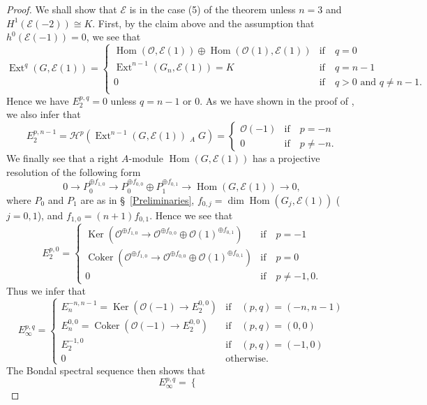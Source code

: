 \documentclass[a4paper,12pt]{amsart}
\DeclareMathOperator{\Hom}{Hom}
\DeclareMathOperator{\Ext}{Ext}
\DeclareMathOperator{\lotimes}{\otimes^{\mathbb{L}}}
\DeclareMathOperator{\Ker}{Ker}
\DeclareMathOperator{\Coker}{Coker}
\begin{document}
\begin{proof}
We shall show that $\mathcal{E}$ is in the case (5) of the theorem
unless $n=3$ and $H^1(\mathcal{E}(-2))\cong K$.
First, by the claim above and the assumption that $h^0(\mathcal{E}(-1))=0$, we see that 
\[\Ext^q(G,\mathcal{E}(1))=
\begin{cases}
\Hom(\mathcal{O},\mathcal{E}(1))\oplus\Hom(\mathcal{O}(1),\mathcal{E}(1))& \textrm{if}\quad  q=0\\
\Ext^{n-1}(G_n,\mathcal{E}(1))=K& \textrm{if}\quad  q= n-1\\
0& \textrm{if}\quad  q>0\textrm{ and }q\neq n-1.\\
\end{cases}
\]
Hence we have $E_2^{p,q}=0$ unless $q= n-1$ or $0$.
As we have shown in the proof of \cite[Proposition 1]{MR3275418},
we also infer that 
\[
E_2^{p,n-1}=\mathcal{H}^p(\Ext^{n-1}(G,\mathcal{E}(1))\lotimes_A G)
=
\begin{cases}
\mathcal{O}(-1)& \textrm{if}\quad  p= -n\\
0& \textrm{if}\quad  p\neq -n.
\end{cases}
\]
We finally see that a right $A$-module $\Hom(G,\mathcal{E}(1))$ has a projective resolution of the following form
\[
0\to P_0^{\oplus f_{1,0}}\to P_0^{\oplus f_{0,0}}\oplus P_1^{\oplus f_{0,1}}\to \Hom (G,\mathcal{E}(1))\to 0,
\]
where $P_0$ and $P_1$ are as in \S~\ref{Preliminaries},
$f_{0,j}=\dim \Hom(G_j, \mathcal{E}(1))$ ($j=0,1$), and $f_{1,0}=(n+1)f_{0,1}$.
Hence we see that
\[E_2^{p,0}=
\begin{cases}
\Ker (\mathcal{O}^{\oplus f_{1,0}}\to \mathcal{O}^{\oplus f_{0,0}}\oplus \mathcal{O}(1)^{\oplus f_{0,1}})& \textrm{if}\quad  p= -1\\
\Coker (\mathcal{O}^{\oplus f_{1,0}}\to \mathcal{O}^{\oplus f_{0,0}}\oplus \mathcal{O}(1)^{\oplus f_{0,1}})& \textrm{if}\quad  p= 0\\
0& \textrm{if}\quad p\neq -1, 0.
\end{cases}
\]
Thus we infer that
\[E_{\infty}^{p,q}=
\begin{cases}
E_n^{-n,n-1}=\Ker (\mathcal{O}(-1)\to E_2^{0,0})& \textrm{if}\quad  (p,q)= (-n,n-1)\\
E_n^{0,0}=\Coker (\mathcal{O}(-1)\to E_2^{0,0})& \textrm{if}\quad  (p,q)= (0,0)\\
E_2^{-1,0}& \textrm{if}\quad (p,q)=(-1,0)\\
0&\textrm{otherwise}.
\end{cases}
\]
The Bondal spectral sequence then shows that
\[E_{\infty}^{p,q}=
\begin{cases}

\end{cases}\]
\end{proof}
\end{document}
